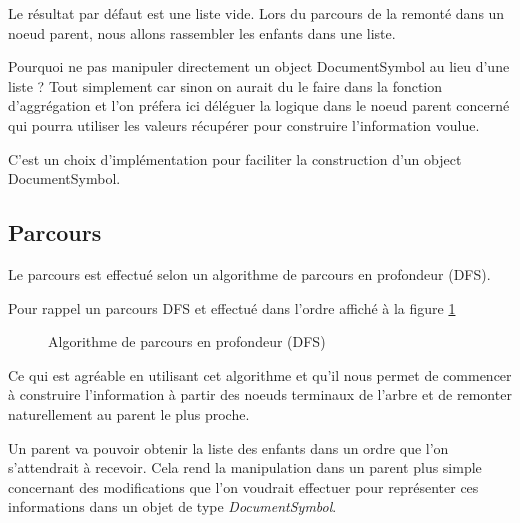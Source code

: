 \documentclass[
    iict, %
    il, %
]{heig-tb}
\begin{document}
Le résultat par défaut est une liste vide. Lors du parcours de la remonté dans un noeud parent, nous allons rassembler les enfants dans une liste.

Pourquoi ne pas manipuler directement un object DocumentSymbol au lieu d'une liste ?
Tout simplement car sinon on aurait du le faire dans la fonction d'aggrégation et l'on préfera ici déléguer la logique dans le noeud parent concerné
qui pourra utiliser les valeurs récupérer pour construire l'information voulue.

C'est un choix d'implémentation pour faciliter la construction d'un object DocumentSymbol.

\subsection{Parcours}
Le parcours est effectué selon un algorithme de parcours en profondeur (DFS).

Pour rappel un parcours DFS et effectué dans l'ordre affiché à la figure \ref*{Algorithme de parcours en profondeur (DFS)}

\begin{figure}[!h]
    \begin{center}
    \end{center}
    \caption[Algorithme de parcours en profondeur (DFS)]{\label{Algorithme de parcours en profondeur (DFS)} Algorithme de parcours en profondeur (DFS)}
\end{figure}

Ce qui est agréable en utilisant cet algorithme et qu'il nous permet de commencer à construire l'information à partir des noeuds terminaux
de l'arbre et de remonter naturellement au parent le plus proche.

Un parent va pouvoir obtenir la liste des enfants dans un ordre que l'on s'attendrait à recevoir.
Cela rend la manipulation dans un parent plus simple concernant des modifications que l'on voudrait effectuer pour représenter ces informations
dans un objet de type \emph{DocumentSymbol}.
\end{document}
